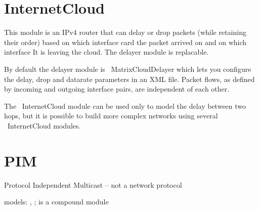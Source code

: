 \section{InternetCloud}

This module is an IPv4 router that can delay or drop packets (while retaining
their order) based on which interface card the packet arrived on and 
on which interface It is leaving the cloud. The delayer module is replacable.

By default the delayer module is ~MatrixCloudDelayer which lets you configure
the delay, drop and datarate parameters in an XML file. Packet flows, as defined
by incoming and outgoing interface pairs, are independent of each other.

The ~InternetCloud module can be used only to model the delay between two hops, but
it is possible to build more complex networks using several ~InternetCloud modules.

\section{PIM}

Protocol Independent Multicast -- not a network protocol 

models: , ;  is a compound module




